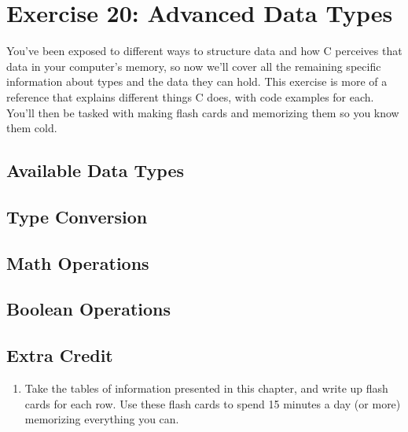 \chapter{Exercise 20: Advanced Data Types }

You've been exposed to different ways to structure data and how C perceives 
that data in your computer's memory, so now we'll cover all the remaining
specific information about types and the data they can hold.  This exercise
is more of a reference that explains different things C does, with code examples
for each.  You'll then be tasked with making flash cards and memorizing them
so you know them cold.

\section{Available Data Types}


\section{Type Conversion}


\section{Math Operations}


\section{Boolean Operations}


\section{Extra Credit}


\begin{enumerate}
\item Take the tables of information presented in this chapter, and write up
    flash cards for each row.  Use these flash cards to spend 15 minutes a
    day (or more) memorizing everything you can.
\end{enumerate}

